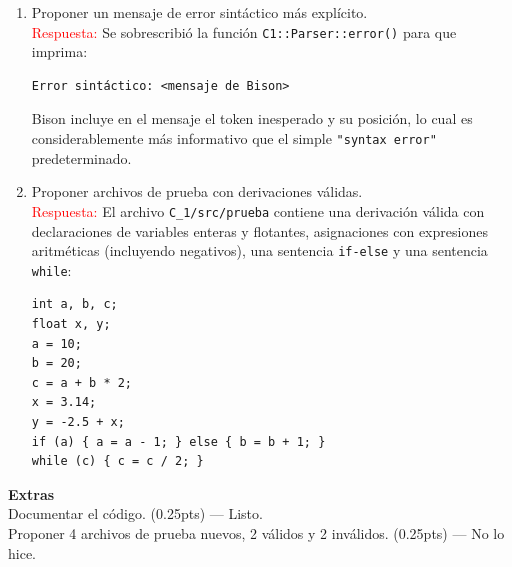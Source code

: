 \documentclass[11pt]{report}
\begin{document}
\begin{enumerate}
\begin{enumerate}[label=\alph*.]
      Se declaró el \texttt{\%union} con el campo \texttt{numero} (que contiene
      \texttt{dval} y \texttt{tipo}) y \texttt{sval} para identificadores. Los tokens
      se anotaron con los campos correspondientes y los no-terminales con el tipo
      \texttt{attr}.

      \item Proponer un mensaje de error sintáctico más explícito. \\
      \textcolor{red}{Respuesta:} Se sobrescribió la función
      \texttt{C1::Parser::error()} para que imprima:
      \begin{verbatim}
Error sintáctico: <mensaje de Bison>
      \end{verbatim}
      Bison incluye en el mensaje el token inesperado y su posición, lo cual es
      considerablemente más informativo que el simple \texttt{"syntax error"}
      predeterminado.

      \item Proponer archivos de prueba con derivaciones válidas. \\
      \textcolor{red}{Respuesta:} El archivo \texttt{C\_1/src/prueba} contiene una
      derivación válida con declaraciones de variables enteras y flotantes,
      asignaciones con expresiones aritméticas (incluyendo negativos), una sentencia
      \texttt{if-else} y una sentencia \texttt{while}:
\begin{verbatim}
int a, b, c;
float x, y;
a = 10;
b = 20;
c = a + b * 2;
x = 3.14;
y = -2.5 + x;
if (a) { a = a - 1; } else { b = b + 1; }
while (c) { c = c / 2; }
\end{verbatim}

    \end{enumerate}

\end{enumerate}

\textbf{Extras} \\

Documentar el código. (0.25pts) --- Listo. \\

Proponer 4 archivos de prueba nuevos, 2 válidos y 2 inválidos. (0.25pts) --- No lo hice. \\
\end{document}
